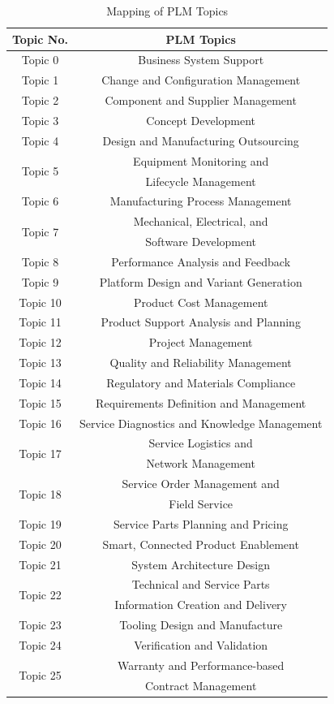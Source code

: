 \documentclass[10pt, conference, compsocconf]{IEEEtran}
\begin{document}
\begin{table}[t]
\renewcommand{\arraystretch}{1.3}
\caption{Mapping of PLM Topics}
\label{table 5: mapping plm}
\centering
{\begin{tabular}{|c|c|}
\hline
\textbf{Topic No.}&\textbf{PLM Topics}\\
\hline
Topic 0&Business System Support  \\
\hline
Topic 1&Change and Configuration Management \\
\hline
Topic 2&Component and Supplier Management \\
\hline
Topic 3&Concept Development \\
\hline
Topic 4&Design and Manufacturing Outsourcing \\
\hline
\multirow{2}{*}{Topic 5}&Equipment Monitoring and\\
&Lifecycle Management \\
\hline
Topic 6&Manufacturing Process Management \\
\hline
\multirow{2}{*}{Topic 7}&Mechanical, Electrical, and \\
&Software Development \\
\hline
Topic 8&Performance Analysis and Feedback \\
\hline
Topic 9&Platform Design and Variant Generation \\
\hline
Topic 10&Product Cost Management \\
\hline
Topic 11&Product Support Analysis and Planning \\
\hline
Topic 12&Project Management \\
\hline
Topic 13&Quality and Reliability Management \\
\hline
Topic 14&Regulatory and Materials Compliance \\
\hline
Topic 15&Requirements Definition and Management \\
\hline
Topic 16&Service Diagnostics and Knowledge Management \\
\hline
\multirow{2}{*}{Topic 17}&Service Logistics and\\
&Network Management \\
\hline
\multirow{2}{*}{Topic 18}&Service Order Management and\\
&Field Service \\
\hline
Topic 19&Service Parts Planning and Pricing \\
\hline
Topic 20&Smart, Connected Product Enablement \\
\hline
Topic 21&System Architecture Design \\
\hline
\multirow{2}{*}{Topic 22}&Technical and Service Parts \\
&Information Creation and Delivery\\
\hline
Topic 23&Tooling Design and Manufacture \\
\hline
Topic 24&Verification and Validation \\
\hline
\multirow{2}{*}{Topic 25}&Warranty and Performance-based \\
&Contract Management\\
\hline
\end{tabular}}
\end{table}
\end{document}
